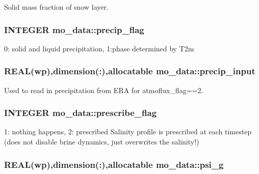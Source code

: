 Solid mass fraction of snow layer. 

\hypertarget{namespacemo__data_a466c2f829a8b266724dd9150cb99d42f}{
\subsubsection[{precip\_\-flag}]{\setlength{\rightskip}{0pt plus 5cm}INTEGER {\bf mo\_\-data::precip\_\-flag}}}
\label{namespacemo__data_a466c2f829a8b266724dd9150cb99d42f}


0: solid and liquid precipitation, 1:phase determined by T2m 

\hypertarget{namespacemo__data_ae066ba3be89578a239547e88eaa6c45e}{
\subsubsection[{precip\_\-input}]{\setlength{\rightskip}{0pt plus 5cm}REAL(wp),dimension(:),allocatable {\bf mo\_\-data::precip\_\-input}}}
\label{namespacemo__data_ae066ba3be89578a239547e88eaa6c45e}


Used to read in precipitation from ERA for atmoflux\_\-flag==2. 

\hypertarget{namespacemo__data_af60329c080a609cfb936b65d8a62e70c}{
\subsubsection[{prescribe\_\-flag}]{\setlength{\rightskip}{0pt plus 5cm}INTEGER {\bf mo\_\-data::prescribe\_\-flag}}}
\label{namespacemo__data_af60329c080a609cfb936b65d8a62e70c}


1: nothing happens, 2: prescribed Salinity profile is prescribed at each timestep (does not disable brine dynamics, just overwrites the salinity!) 

\hypertarget{namespacemo__data_ab334544ada2f82dd312588426d1cfa64}{
\subsubsection[{psi\_\-g}]{\setlength{\rightskip}{0pt plus 5cm}REAL(wp),dimension(:),allocatable {\bf mo\_\-data::psi\_\-g}}}
\label{namespacemo__data_ab334544ada2f82dd312588426d1cfa64}


